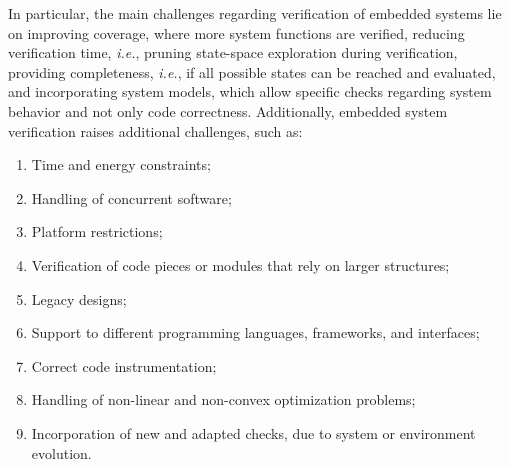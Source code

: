\documentclass[format=acmsmall, review=false, screen=true]{acmart}
\begin{document}
In particular, the main challenges regarding verification of embedded systems lie on improving coverage, where more system functions are verified, reducing verification time, {\it i.e.}, pruning state-space exploration during verification, providing completeness, {\it i.e.},  if all possible states can be reached and evaluated, and incorporating system models, which allow specific checks regarding system behavior and not only code correctness. Additionally, embedded system verification raises additional challenges, such as:
%
\begin{enumerate}
	\item Time and energy constraints;
	\item Handling of concurrent software;
	\item Platform restrictions;
	\item Verification of code pieces or modules that rely on larger structures;
	\item Legacy designs; %
	\item Support to different programming languages, frameworks, and interfaces;
	\item Correct code instrumentation;
	\item Handling of non-linear and non-convex optimization problems;
	\item Incorporation of new and adapted checks, due to system or environment evolution.
\end{enumerate}
\end{document}
